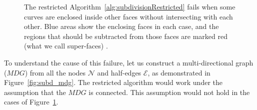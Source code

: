 \begin{figure}
\begin{subfigure}{.32\textwidth}
  \end{subfigure}%
  \caption[xxx]
          {The restricted Algorithm~\ref{alg:subdivisionRestricted} fails when some curves are enclosed inside other faces without intersecting with each other.
          Blue areas show the enclosing faces in each case, and the regions that should be subtracted from those faces are marked red (what we call super-faces) .}
  \label{fig:subd_restrictedFail}
\end{figure}

To understand the cause of this failure, let us construct a multi-directional graph ($\mathit{MDG}$) from all the nodes $\mathcal{N}$ and half-edges $\mathcal{E}$, as demonstrated in Figure~\ref{fig:subd_mdg}.
The restricted algorithm would work under the assumption that the $\mathit{MDG}$ is connected.
This assumption would not hold in the cases of Figure~\ref{fig:subd_restrictedFail}.

